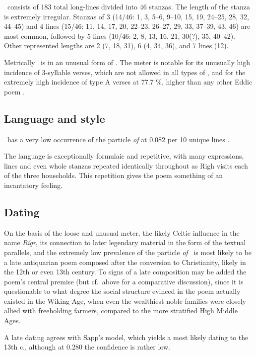 \Rigsthula\ consists of 183 total long-lines divided into 46 stanzas.  The length of the stanza is extremely irregular.  Stanzas of 3 (14/46: 1, 3, 5--6, 9--10, 15, 19, 24--25, 28, 32, 44--45) and 4 lines (15/46: 11, 14, 17, 20, 22--23, 26--27, 29, 33, 37--39, 43, 46) are most common, followed by 5 lines (10/46: 2, 8, 13, 16, 21, 30(?), 35, 40--42).  Other represented lengths are 2 (7, 18, 31), 6 (4, 34, 36), and 7 lines (12).

Metrically \Rigsthula\ is in an unusual form of \Fornyrdislag.  The meter is notable for its unusually high incidence of 3-syllable verses, which are not allowed in all types of \Fornyrdislag, and for the extremely high incidence of type A verses at 77.7 \%, higher than any other Eddic poem \parencite[152]{Sapp2022}.

\subsection{Language and style}

\Rigsthula\ has a very low occurrence of the particle \emph{of} at 0.082 per 10 unique lines \parencite[70]{Sapp2022}.

The language is exceptionally formulaic and repetitive, with many expressions, lines and even whole stanzas repeated identically throughout as Righ visits each of the three households.  This repetition gives the poem something of an incantatory feeling.

\subsection{Dating}

On the basis of the loose and unusual meter, the likely Celtic influence in the name \emph{Rígr}, its connection to later legendary material in the form of the textual parallels, and the extremely low prevalence of the particle \emph{of} \Rigsthula\ is most likely to be a late antiquarian poem composed after the conversion to Christianity, likely in the 12th or even 13th century.  To signs of a late composition may be added the poem’s central premise (but cf.~above for a comparative discussion), since it is questionable to what degree the social structure evinced in the poem actually existed in the Wiking Age, when even the wealthiest noble families were closely allied with freeholding farmers, compared to the more stratified High Middle Ages.

A late dating agrees with Sapp’s model, which yields a most likely dating to the 13th c., although at 0.280 the confidence is rather low.

